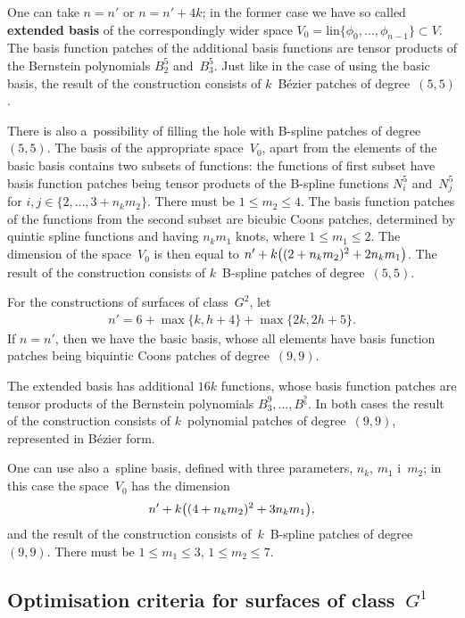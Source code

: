 One can take $n=n'$ or $n=n'+4k$; in the former case we have so called
\textbf{extended basis} of the correspondingly wider space
$V_0=\mathord{\mathrm{lin}}\{\phi_0,\ldots,\phi_{n-1}\}\subset V$.
The basis function patches of the additional basis functions are tensor
products of the Bernstein polynomials $B^5_2$ and~$B^5_3$. Just like in the
case of using the basic basis, the result of the construction consists of
$k$~B\'{e}zier patches of degree~$(5,5)$.

There is also a~possibility of filling the hole with B-spline patches
of degree~$(5,5)$. The basis of the appropriate space~$V_0$, apart from the
elements of the basic basis contains two subsets of functions:
the functions of first subset have basis function patches being tensor products
of the B-spline functions $N^5_i$ and~$N^5_j$ for $i,j\in\{2,\ldots,3+n_km_2\}$.
There must be $1\leq m_2\leq 4$. The basis function patches of the functions
from the second subset are bicubic Coons patches, determined by
quintic spline functions and having $n_km_1$ knots, where
$1\leq m_1\leq 2$. The dimension of the space~$V_0$ is then equal to
$n'+k\bigl((2+n_km_2)^2+2n_km_1\bigr)$. The result of the construction consists
of $k$~B-spline patches of degree~$(5,5)$.

For the constructions of surfaces of class~$G^2$, let
\begin{align*}
  n' = 6+\max\{k,h+4\}+\max\{2k,2h+5\}.
\end{align*}
If $n=n'$, then we have the basic basis, whose all elements have basis function
patches being biquintic Coons patches of degree~$(9,9)$.

The extended basis has additional $16k$ functions, whose basis function
patches are tensor products of the Bernstein polynomials $B^9_3,\ldots,B^^9_6$.
In both cases the result of the construction consists of $k$~polynomial patches
of degree~$(9,9)$, represented in B\'{e}zier form.

One can use also a~spline basis, defined with three parameters,
$n_k$, $m_1$ i~$m_2$; in this case the space~$V_0$ has the dimension
\begin{align*}
  n' + k\bigl((4+n_km_2)^2+3n_km_1\bigr),
\end{align*}
and the result of the construction consists of~$k$~B-spline patches
of degree~$(9,9)$. There must be $1\leq m_1\leq 3$, $1\leq m_2\leq 7$.


\subsection{Optimisation criteria for surfaces of class~$G^1$}

